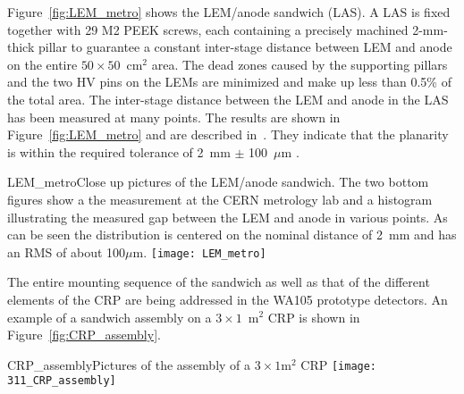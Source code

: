 Figure~\ref{fig:LEM_metro} shows the LEM/anode sandwich (LAS).  A LAS is 
fixed together with 29 M2 PEEK screws, each containing a precisely
machined 2-mm-thick pillar to guarantee a constant inter-stage
distance between LEM and anode on the entire $50\times50$~cm$^2$
area.  The dead zones caused by the supporting pillars and the two HV
pins on the LEMs are minimized and make up less than 0.5\% of the
total area. The inter-stage distance between the LEM and anode in the
LAS has been measured at many points. The results are shown in
Figure~\ref{fig:LEM_metro} and are described
in~\cite{EDMS_metro_lem_anode}. They indicate that the planarity is
within the required tolerance of 2~mm $\pm$ 100~$\mu$m .
\begin{cdrfigure}{LEM_metro}{Close up pictures of the LEM/anode sandwich. The two
       bottom figures show a the measurement at the CERN metrology lab
       and a histogram illustrating the measured gap between the LEM
       and anode in various points. As can be seen the distribution is
       centered on the nominal distance of 2~mm and has an RMS of
       about 100$\mu$m.}
     \texttt{[image: LEM\_metro]}
\end{cdrfigure}

The entire mounting sequence of the sandwich as well as that of the
different elements of the CRP are being addressed in the WA105
prototype detectors. An example of a sandwich assembly on a
$3\times1$~m$^2$ CRP is shown in Figure~\ref{fig:CRP_assembly}.
\begin{cdrfigure}{CRP_assembly}{Pictures of the assembly of a $3\times1$m$^2$ CRP}
     \texttt{[image: 311\_CRP\_assembly]}  
\end{cdrfigure}


